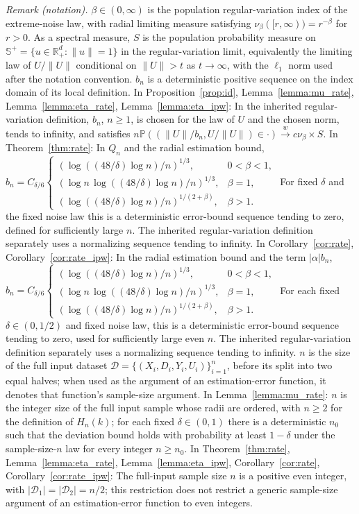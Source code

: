 \documentclass[12pt]{article}
\theoremstyle{plain}
\theoremstyle{definition}
\begin{document}
\noindent\textit{Remark (notation).} $\beta\in(0,\infty)$ is the population regular-variation index of the extreme-noise law, with radial limiting measure satisfying $\nu_\beta([r,\infty))=r^{-\beta}$ for $r>0$. As a spectral measure, $S$ is the population probability measure on $\mathbb{S}^+=\{u\in\mathbb{R}_+^d:\|u\|=1\}$ in the regular-variation limit, equivalently the limiting law of $U/\|U\|$ conditional on $\|U\|>t$ as $t\rightarrow\infty$, with the $\ell_1$ norm used after the notation convention. $b_n$ is a deterministic positive sequence on the index domain of its local definition. In Proposition~\ref{prop:id}, Lemma~\ref{lemma:mu_rate}, Lemma~\ref{lemma:eta_rate}, Lemma~\ref{lemma:eta_ipw}: In the inherited regular-variation definition, $b_n$, $n\geq1$, is chosen for the law of $U$ and the chosen norm, tends to infinity, and satisfies $n\mathbb P((\|U\|/b_n,U/\|U\|)\in\cdot)\overset{w}{\rightarrow}c\nu_\beta\times S$. In Theorem~\ref{thm:rate}: In $Q_n$ and the radial estimation bound, $b_n=C_{\delta/6}\begin{cases}(\log((48/\delta)\log n)/n)^{1/3},&0<\beta<1,\\(\log n\,\log((48/\delta)\log n)/n)^{1/3},&\beta=1,\\(\log((48/\delta)\log n)/n)^{1/(2+\beta)},&\beta>1.\end{cases}$ For fixed $\delta$ and the fixed noise law this is a deterministic error-bound sequence tending to zero, defined for sufficiently large $n$. The inherited regular-variation definition separately uses a normalizing sequence tending to infinity. In Corollary~\ref{cor:rate}, Corollary~\ref{cor:rate_ipw}: In the radial estimation bound and the term $|\alpha|b_n$, $b_n=C_{\delta/6}\begin{cases}(\log((48/\delta)\log n)/n)^{1/3},&0<\beta<1,\\(\log n\,\log((48/\delta)\log n)/n)^{1/3},&\beta=1,\\(\log((48/\delta)\log n)/n)^{1/(2+\beta)},&\beta>1.\end{cases}$ For each fixed $\delta\in(0,1/2)$ and fixed noise law, this is a deterministic error-bound sequence tending to zero, used for sufficiently large even $n$. The inherited regular-variation definition separately uses a normalizing sequence tending to infinity. $n$ is the size of the full input dataset $\mathcal{D}=\{(X_i,D_i,Y_i,U_i)\}_{i=1}^n$, before its split into two equal halves; when used as the argument of an estimation-error function, it denotes that function's sample-size argument. In Lemma~\ref{lemma:mu_rate}: $n$ is the integer size of the full input sample whose radii are ordered, with $n\geq2$ for the definition of $H_n(k)$; for each fixed $\delta\in(0,1)$ there is a deterministic $n_0$ such that the deviation bound holds with probability at least $1-\delta$ under the sample-size-$n$ law for every integer $n\geq n_0$. In Theorem~\ref{thm:rate}, Lemma~\ref{lemma:eta_rate}, Lemma~\ref{lemma:eta_ipw}, Corollary~\ref{cor:rate}, Corollary~\ref{cor:rate_ipw}: The full-input sample size $n$ is a positive even integer, with $|\mathcal D_1|=|\mathcal D_2|=n/2$; this restriction does not restrict a generic sample-size argument of an estimation-error function to even integers. 
\end{document}

